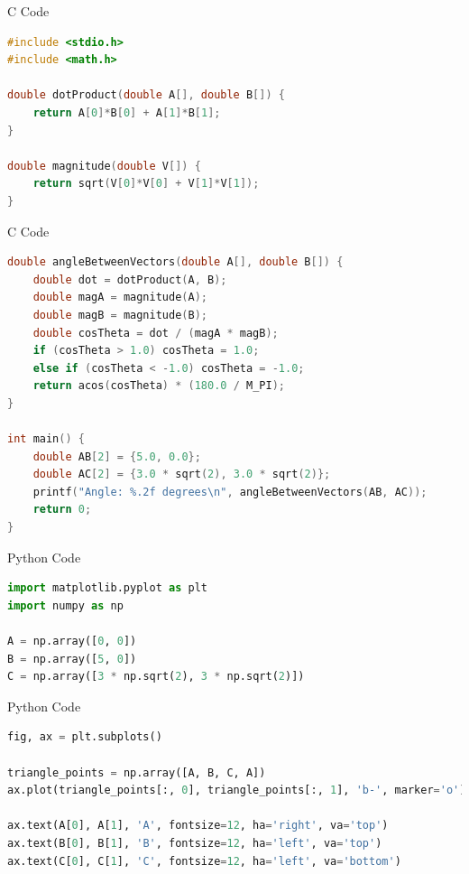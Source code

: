 \documentclass{beamer}
\begin{document}
\begin{frame}[fragile]{C Code}
\begin{lstlisting}[language=C]
#include <stdio.h>
#include <math.h>

double dotProduct(double A[], double B[]) {
    return A[0]*B[0] + A[1]*B[1];
}

double magnitude(double V[]) {
    return sqrt(V[0]*V[0] + V[1]*V[1]);
}
\end{lstlisting}
\end{frame}

\begin{frame}[fragile]{C Code}
\begin{lstlisting}[language=C]
double angleBetweenVectors(double A[], double B[]) {
    double dot = dotProduct(A, B);
    double magA = magnitude(A);
    double magB = magnitude(B);
    double cosTheta = dot / (magA * magB);
    if (cosTheta > 1.0) cosTheta = 1.0;
    else if (cosTheta < -1.0) cosTheta = -1.0;
    return acos(cosTheta) * (180.0 / M_PI);
}

int main() {
    double AB[2] = {5.0, 0.0};
    double AC[2] = {3.0 * sqrt(2), 3.0 * sqrt(2)};
    printf("Angle: %.2f degrees\n", angleBetweenVectors(AB, AC));
    return 0;
}
\end{lstlisting}
\end{frame}

\begin{frame}[fragile]{Python Code}
\begin{lstlisting}[language=Python]
import matplotlib.pyplot as plt
import numpy as np

A = np.array([0, 0])
B = np.array([5, 0])
C = np.array([3 * np.sqrt(2), 3 * np.sqrt(2)])
\end{lstlisting}
\end{frame}

\begin{frame}[fragile]{Python Code}
\begin{lstlisting}[language=Python]
fig, ax = plt.subplots()

triangle_points = np.array([A, B, C, A])
ax.plot(triangle_points[:, 0], triangle_points[:, 1], 'b-', marker='o')

ax.text(A[0], A[1], 'A', fontsize=12, ha='right', va='top')
ax.text(B[0], B[1], 'B', fontsize=12, ha='left', va='top')
ax.text(C[0], C[1], 'C', fontsize=12, ha='left', va='bottom')
\end{lstlisting}
\end{frame}
\end{document}
